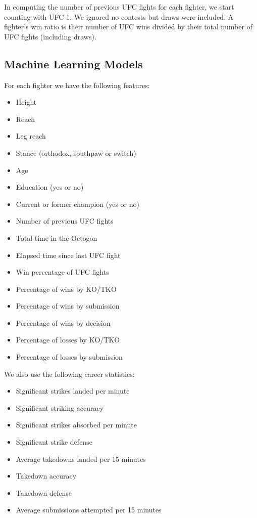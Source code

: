 In computing the number of previous UFC fights for each fighter, we start
counting with UFC 1. We ignored no contests but draws were included. A fighter's
win ratio is their number of UFC wins divided by their
total number of UFC fights (including draws).

\subsection*{Machine Learning Models}

For each fighter we have the following features:

\begin{itemize}[noitemsep]
  \item Height
  \item Reach
  \item Leg reach
  \item Stance (orthodox, southpaw or switch)
  \item Age
  \item Education (yes or no)
  \item Current or former champion (yes or no)
  \item Number of previous UFC fights
  \item Total time in the Octogon
  \item Elapsed time since last UFC fight
  \item Win percentage of UFC fights
  \item Percentage of wins by KO/TKO
  \item Percentage of wins by submission
  \item Percentage of wins by decision
  \item Percentage of losses by KO/TKO
  \item Percentage of losses by submission
\end{itemize}

\noindent
We also use the following career statistics:

\begin{itemize}[noitemsep]
  \item Significant strikes landed per minute
  \item Significant striking accuracy
  \item Significant strikes absorbed per minute
  \item Significant strike defense
  \item Average takedowns landed per 15 minutes
  \item Takedown accuracy
  \item Takedown defense
  \item Average submissions attempted per 15 minutes
\end{itemize}

